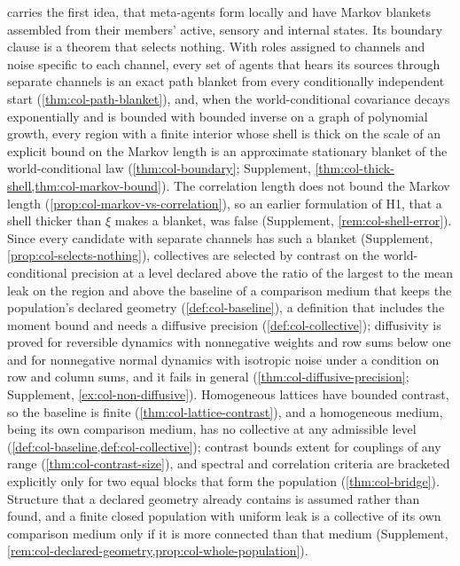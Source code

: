  carries the first idea, that meta-agents form locally and have Markov blankets assembled from their members' active, sensory and internal states. Its boundary clause is a theorem that selects nothing. With roles assigned to channels and noise specific to each channel, every set of agents that hears its sources through separate channels is an exact path blanket from every conditionally independent start (\cref{thm:col-path-blanket}), and, when the world-conditional covariance decays exponentially and is bounded with bounded inverse on a graph of polynomial growth, every region with a finite interior whose shell is thick on the scale of an explicit bound on the Markov length is an approximate stationary blanket of the world-conditional law (\cref{thm:col-boundary}; Supplement, \cref{thm:col-thick-shell,thm:col-markov-bound}). The correlation length does not bound the Markov length (\cref{prop:col-markov-vs-correlation}), so an earlier formulation of H1, that a shell thicker than $\xi$ makes a blanket, was false (Supplement, \cref{rem:col-shell-error}). Since every candidate with separate channels has such a blanket (Supplement, \cref{prop:col-selects-nothing}), collectives are selected by contrast on the world-conditional precision at a level declared above the ratio of the largest to the mean leak on the region and above the baseline of a comparison medium that keeps the population's declared geometry (\cref{def:col-baseline}), a definition that includes the moment bound and needs a diffusive precision (\cref{def:col-collective}); diffusivity is proved for reversible dynamics with nonnegative weights and row sums below one and for nonnegative normal dynamics with isotropic noise under a condition on row and column sums, and it fails in general (\cref{thm:col-diffusive-precision}; Supplement, \cref{ex:col-non-diffusive}). Homogeneous lattices have bounded contrast, so the baseline is finite (\cref{thm:col-lattice-contrast}), and a homogeneous medium, being its own comparison medium, has no collective at any admissible level (\cref{def:col-baseline,def:col-collective}); contrast bounds extent for couplings of any range (\cref{thm:col-contrast-size}), and spectral and correlation criteria are bracketed explicitly only for two equal blocks that form the population (\cref{thm:col-bridge}). Structure that a declared geometry already contains is assumed rather than found, and a finite closed population with uniform leak is a collective of its own comparison medium only if it is more connected than that medium (Supplement, \cref{rem:col-declared-geometry,prop:col-whole-population}).


